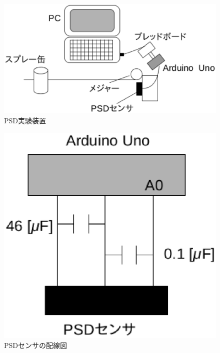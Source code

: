 \documentclass[11pt,a4]{jsarticle}
\begin{document}
\begin{figure}[t]
  \begin{center}
   \includegraphics[scale = 0.8]{picture/psded.eps}
   \caption{PSD実験装置}
   \label{psded}
  \end{center}
\end{figure}

\begin{figure}
 \begin{center}
  \includegraphics[scale = 0.8]{picture/psdwd.eps}
  \caption{PSDセンサの配線図}
  \label{psdwd}
 \end{center}
\end{figure}


\newpage
\end{document}
